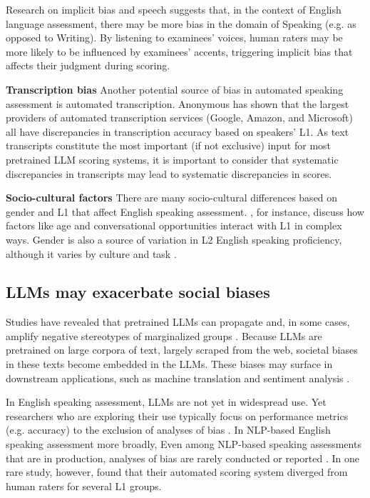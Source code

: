 \documentclass [PhD] {uclathes}
\begin{document}
Research on implicit bias and speech suggests that, in the context of English language assessment, there may be more bias in the domain of Speaking (e.g. as opposed to Writing). By listening to examinees’ voices, human raters may be more likely to be influenced by examinees’ accents, triggering implicit bias that affects their judgment during scoring.

\noindent \textbf{Transcription bias}\; 
Another potential source of bias in automated speaking assessment is automated transcription. Anonymous has shown that the largest providers of automated transcription services (Google, Amazon, and Microsoft) all have discrepancies in transcription accuracy based on speakers’ L1. As text transcripts constitute the most important (if not exclusive) input for most pretrained LLM scoring systems, it is important to consider that systematic discrepancies in transcripts may lead to systematic discrepancies in scores.

\noindent \textbf{Socio-cultural factors}\; 
There are many socio-cultural differences based on gender and L1 that affect English speaking assessment. \citet{derwing2013development}, for instance, discuss how factors like age and conversational opportunities interact with L1 in complex ways. Gender is also a source of variation in L2 English speaking proficiency, although it varies by culture and task \citep{denies2022mapping}. 

\subsection{LLMs may exacerbate social biases}

Studies have revealed that pretrained LLMs can propagate and, in some cases, amplify negative stereotypes of marginalized groups \citep{blodgett2020}. Because LLMs are pretrained on large corpora of text, largely scraped from the web, societal biases in these texts become embedded in the LLMs. These biases may surface in downstream applications, such as machine translation \citep{stanovsky2019evaluating} and sentiment analysis \citep{kiritchenko2018examining}. 

In English speaking assessment, LLMs are not yet in widespread use. Yet researchers who are exploring their use typically focus on performance metrics (e.g. accuracy) to the exclusion of analyses of bias \citep[e.g.][]{wang2021automated}. In NLP-based English speaking assessment more broadly, Even among NLP-based speaking assessments that are in production, analyses of bias are rarely conducted or reported \citep[e.g. ][]{collier2020test}. In one rare study, however, \citet{wang2018monitoring} found that their automated scoring system diverged from human raters for several L1 groups.  
\end{document}
